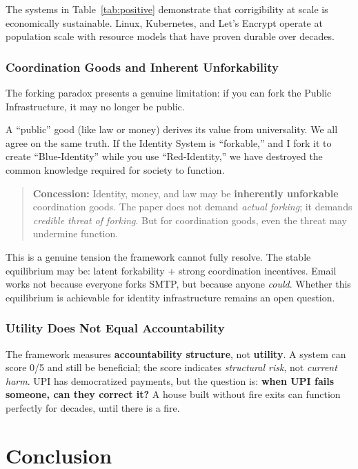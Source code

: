 The systems in Table~\ref{tab:positive} demonstrate that corrigibility at scale is economically sustainable. Linux, Kubernetes, and Let's Encrypt operate at population scale with resource models that have proven durable over decades.

\subsubsection{Coordination Goods and Inherent Unforkability}
\label{subsec:coordination}

The forking paradox presents a genuine limitation: if you can fork the Public Infrastructure, it may no longer be public.

A ``public'' good (like law or money) derives its value from universality. We all agree on the same truth. If the Identity System is ``forkable,'' and I fork it to create ``Blue-Identity'' while you use ``Red-Identity,'' we have destroyed the common knowledge required for society to function.

\begin{quote}
\textbf{Concession:} Identity, money, and law may be \textbf{inherently unforkable} coordination goods. The paper does not demand \textit{actual forking}; it demands \textit{credible threat of forking}. But for coordination goods, even the threat may undermine function.
\end{quote}

This is a genuine tension the framework cannot fully resolve. The stable equilibrium may be: latent forkability + strong coordination incentives. Email works not because everyone forks SMTP, but because anyone \textit{could}. Whether this equilibrium is achievable for identity infrastructure remains an open question.

\subsubsection{Utility Does Not Equal Accountability}
\label{subsec:utility}

The framework measures \textbf{accountability structure}, not \textbf{utility}. A system can score 0/5 and still be beneficial; the score indicates \textit{structural risk}, not \textit{current harm}. UPI has democratized payments, but the question is: \textbf{when UPI fails someone, can they correct it?} A house built without fire exits can function perfectly for decades, until there is a fire.

\section{Conclusion}

